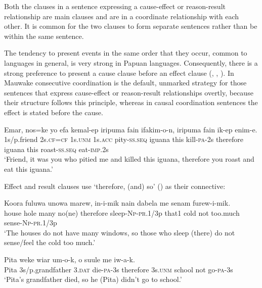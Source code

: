Both the clauses in a sentence expressing a cause-effect or reason-result relationship are main clauses and are in a coordinate relationship with each other. It is common for the two clauses to form separate sentences rather than be within the same sentence. 

The tendency to present events in the same order that they occur, common to languages in general, is very strong in Papuan languages. Consequently, there is a strong preference to present a cause clause before an effect clause (\citealt[409]{Haiman1980}, \citealt[59]{Roberts1987}, \citealt{Reesink1987}). In Mauwake consecutive coordination is the default, unmarked strategy for those sentences that express cause-effect or reason-result relationships overtly, because their structure follows this principle, whereas in causal coordination sentences the effect is stated before the cause. 

\ea%
\label{ex:8:x1400}
\gll Emar,  nos=ke  yo  efa  kemal-ep  iripuma  fain ifakim-o-n,    iripuma  fain  ik-ep  enim-e.\\
1s/p.friend  2s.\textsc{cf}=\textsc{cf}  1s.\textsc{unm}  1s.\textsc{acc}  pity-\textsc{ss}.\textsc{seq}  iguana  this kill-\textsc{pa}-2s  therefore  iguana  this  roast-\textsc{ss}.\textsc{seq}  eat-\textsc{imp}.2s\\
\glt`Friend, it was you who pitied me and killed this iguana, therefore you roast and eat this iguana.'
\z


Effect and result clauses use  `therefore, (and) so' () as their connective:

\ea%
\label{ex:8:x1401}
\gll Koora  fuluwa  unowa  marew,    in-i-mik  nain dabela  me  senam  furew-i-mik.\\
house  hole  many  no(ne)  therefore  sleep-\textsc{Np}-\textsc{pr}.1/3p  that1 cold  not  too.much  sense-\textsc{Np}-\textsc{pr}.1/3p\\
\glt `The houses do not have many windows, so those who sleep (there) do not sense/feel the cold too much.'
\z


\ea%
\label{ex:8:x1402}
\gll Pita  weke  wiar  um-o-k,    o  suule me  iw-a-k. \\
Pita  3s/p.grandfather  3.\textsc{dat}  die-\textsc{pa}-3s  therefore  3s.\textsc{unm} school not  go-\textsc{pa}-3s\\
\glt`Pita's grandfather died, so he (Pita) didn't go to school.'
\z



